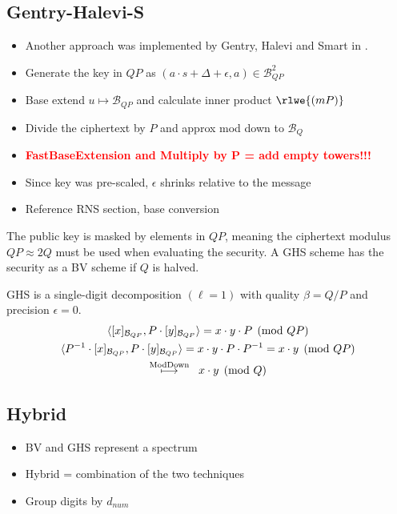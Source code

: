 \subsection{Gentry-Halevi-S}
\begin{itemize}
    \item Another approach was implemented by Gentry, Halevi and Smart in \cite{cryptoeprint:2012/099}. 
    \item Generate the key in $QP$ as $(a\cdot s + \Delta + \epsilon, a) \in \mathcal{B}_{QP}^2$
    \item Base extend $u \mapsto \mathcal{B}_{QP}$ and calculate inner product $\rlwe{(mP)}$
    \item Divide the ciphertext by $P$ and approx mod down to $\mathcal{B}_{Q}$
    \item \textcolor{red}{\textbf{FastBaseExtension and Multiply by P = add empty towers!!!}}
    \item Since key was pre-scaled, $\epsilon$ shrinks relative to the message
    \item Reference RNS section, base conversion
\end{itemize}

\begin{remark}[GHS Security] %
    \label{remark:ghs-security}
    The public key is masked by elements in $QP$, meaning the ciphertext modulus $QP \approx 2Q$ must be used when evaluating the security. A GHS scheme has the security as a BV scheme if $Q$ is halved. 
\end{remark}

\begin{lemma}
    GHS is a single-digit decomposition $(\ell = 1)$ with quality $\beta = Q/P$ and precision $\epsilon = 0$. 
    \begin{gather} %
        \langle [x]_{\mathcal{B}_{QP}}, P\cdot [y]_{\mathcal{B}_{QP}}\rangle = x\cdot y \cdot P \pmod{QP} \\
        \langle P^{-1}\cdot [x]_{\mathcal{B}_{QP}}, P\cdot [y]_{\mathcal{B}_{QP}}\rangle = x\cdot y \cdot P \cdot P^{-1} = x\cdot y \pmod{QP} \\
        \overset{\tiny\text{ModDown}}{\longmapsto} \;\; x\cdot y \pmod{Q}
    \end{gather}

\end{lemma}

\subsection{Hybrid}
\label{sec:hybrid}
\begin{itemize}
    \item BV and GHS represent a spectrum
    \item Hybrid = combination of the two techniques
    \item Group digits by $d_{num}$
\end{itemize}